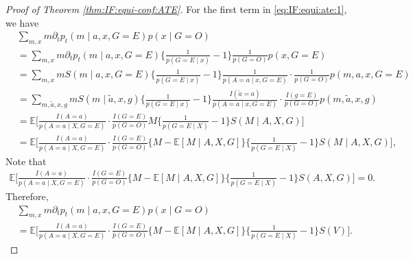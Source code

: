 \documentclass[10pt]{article}
\newcommand{\E}{\mathbb{E}}
\begin{document}
\begin{proof}[Proof of Theorem \ref{thm:IF:equi-conf:ATE}]
For the first term in \eqref{eq:IF:equi:ate:1}, we have
\begin{align*}
&\sum_{m,x} m\partial_t p_t(m\mid a,x,G=E)p(x\mid G=O)\\
&=\sum_{m,x} m\partial_t p_t(m\mid a,x,G=E)\{\frac{1}{p(G=E\mid x)}-1\}\frac{1}{p(G=O)}p(x,G=E)\\
&=\sum_{m,x} mS(m\mid a,x,G=E)\{\frac{1}{p(G=E\mid x)}-1\}\frac{1}{p(A=a\mid x,G=E)}\cdot\frac{1}{p(G=O)}p(m,a,x,G=E)\\
&=\sum_{m,\tilde{a},x,g} mS(m\mid \tilde{a},x,g)\{\frac{1}{p(G=E\mid x)}-1\}\frac{I(\tilde{a}=a)}{p(A=a\mid x,G=E)}\cdot\frac{I(g=E)}{p(G=O)}p(m,\tilde{a},x,g)\\
&=\E\Big[
\frac{I(A=a)}{p(A=a\mid X,G=E)}\cdot\frac{I(G=E)}{p(G=O)}
M\{\frac{1}{p(G=E\mid X)}-1\}S(M\mid A,X,G)
\Big]\\
&=\E\Big[
\frac{I(A=a)}{p(A=a\mid X,G=E)}\cdot\frac{I(G=E)}{p(G=O)}
\{M-\E[M\mid A,X,G]\}\{\frac{1}{p(G=E\mid X)}-1\}S(M\mid A,X,G)
\Big],
\end{align*}
Note that
\begin{align*}
\E\Big[
\frac{I(A=a)}{p(A=a\mid X,G=E)}\cdot\frac{I(G=E)}{p(G=O)}
\{M-\E[M\mid A,X,G]\}\{\frac{1}{p(G=E\mid X)}-1\}S(A,X,G)
\Big]=0.
\end{align*}
Therefore,
\begin{equation}
\label{eq:IF:equi:ate:2}
\begin{aligned}
&\sum_{m,x} m\partial_t p_t(m\mid a,x,G=E)p(x\mid G=O)\\
&=\E\Big[
\frac{I(A=a)}{p(A=a\mid X,G=E)}\cdot\frac{I(G=E)}{p(G=O)}
\{M-\E[M\mid A,X,G]\}\{\frac{1}{p(G=E\mid X)}-1\}S(V)
\Big].
\end{aligned}
\end{equation}


\end{proof}
\end{document}
